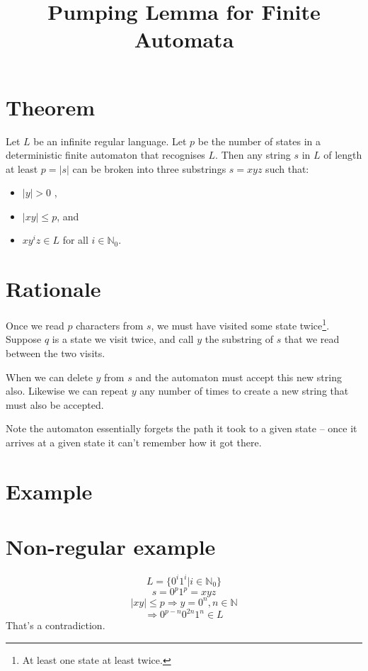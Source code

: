 \documentclass[a4paper, hidelinks, twocolumn, 9pt]{article}
\title{Pumping Lemma for Finite Automata}
\author{}
\date{}
\begin{document}
  
  \maketitle
  \thispagestyle{fancy}

  
  \section*{Theorem}
    Let \(L\) be an infinite regular language.
    Let \(p\) be the number of states in a deterministic finite automaton that recognises \(L\).
    Then any string \(s\) in \(L\) of length at least \(p = |s|\) can be broken into three substrings \(s=xyz\) such that:
    \begin{itemize}
      \item \(|y| > 0\) ,
      \item \(|xy| \leq p\), and
      \item \(xy^iz \in L\) for all \(i \in \mathbb{N}_0\).
    \end{itemize}
  
    \section*{Rationale}
      Once we read \(p\) characters from \(s\), we must have visited some state twice\footnote{At least one state at least twice.}.
      Suppose \(q\) is a state we visit twice, and call \(y\) the substring of \(s\) that we read between the two visits.

      When we can delete \(y\) from \(s\) and the automaton must accept this new string also.
      Likewise we can repeat \(y\) any number of times to create a new string that must also be accepted.

      Note the automaton essentially forgets the path it took to a given state -- once it arrives at a given state it can't remember how it got there.

    \section*{Example}

    \section*{Non-regular example}
      \[L = \{0^i1^i | i \in \mathbb{N}_0\}\]
      \[s = 0^p1^p = xyz \]
      \[|xy| \leq p \Rightarrow y = 0^n, n \in \mathbb{N}\]
      \[\Rightarrow 0^{p-n}0^{2n}1^n \in L \]
      That's a contradiction.

    
  
  
\end{document}
